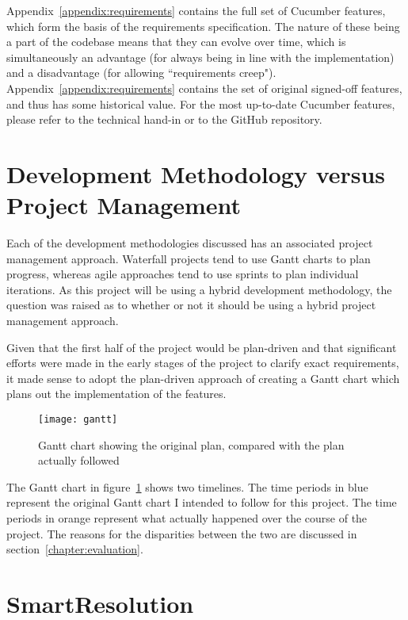 Appendix~\ref{appendix:requirements} contains the full set of Cucumber features, which form the basis of the requirements specification. The nature of these being a part of the codebase means that they can evolve over time, which is simultaneously an advantage (for always being in line with the implementation) and a disadvantage (for allowing ``requirements creep"). Appendix~\ref{appendix:requirements} contains the set of original signed-off features, and thus has some historical value. For the most up-to-date Cucumber features, please refer to the technical hand-in or to the GitHub repository.

\section{Development Methodology versus Project Management}

Each of the development methodologies discussed has an associated project management approach. Waterfall projects tend to use Gantt charts to plan progress, whereas agile approaches tend to use sprints to plan individual iterations. As this project will be using a hybrid development methodology, the question was raised as to whether or not it should be using a hybrid project management approach.

Given that the first half of the project would be plan-driven and that significant efforts were made in the early stages of the project to clarify exact requirements, it made sense to adopt the plan-driven approach of creating a Gantt chart which plans out the implementation of the features.

\begin{figure}[h!]
  \centering
    \ifimages
    \texttt{[image: gantt]}
    \fi
  \caption{Gantt chart showing the original plan, compared with the plan actually followed}
  \label{uml:gantt}
\end{figure}

The Gantt chart in figure~\ref{uml:gantt} shows two timelines. The time periods in blue represent the original Gantt chart I intended to follow for this project. The time periods in orange represent what actually happened over the course of the project. The reasons for the disparities between the two are discussed in section~\ref{chapter:evaluation}.

\section{SmartResolution}

